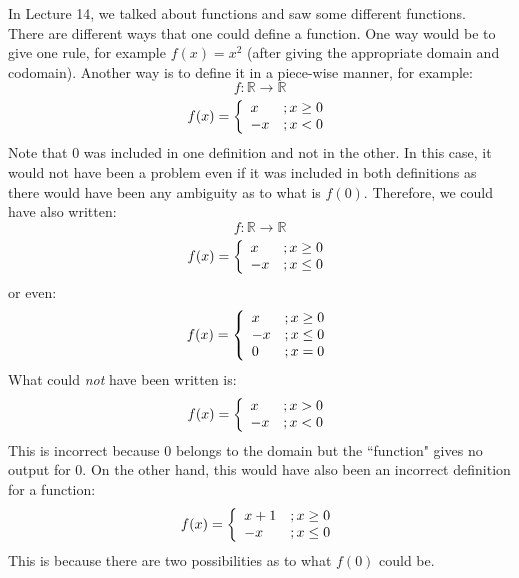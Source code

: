 In Lecture 14, we talked about functions and saw some different functions.\\
There are different ways that one could define a function. One way would be to give one rule, for example $f(x) = x^2$ (after giving the appropriate domain and codomain). Another way is to define it in a piece-wise manner, for example:\\
$$f:\mathbb{R}\to\mathbb{R}$$
$$f(x) = \left\{
\begin{array}{l r}
    x & ;x\ge 0 \\
    -x & ;x < 0
\end{array}\right.$$
Note that 0 was included in one definition and not in the other. In this case, it would not have been a problem even if it was included in both definitions as there would have been any ambiguity as to what is $f(0)$. Therefore, we could have also written:\\
$$f:\mathbb{R}\to\mathbb{R}$$
$$f(x) = \left\{
\begin{array}{l r}
    x & ;x\ge 0 \\
    -x & ;x \le 0
\end{array}\right.$$
or even:
\\$$f(x) = \left\{
\begin{array}{l r}
    x & ;x\ge 0 \\
    -x & ;x \le 0 \\
    0 & ;x = 0
\end{array}\right.$$
What could \textit{not} have been written is:\\
$$f(x) = \left\{
\begin{array}{l r}
    x & ;x > 0 \\
    -x & ;x < 0
\end{array}\right.$$
This is incorrect because $0$ belongs to the domain but the ``function" gives no output for $0$. On the other hand, this would have also been an incorrect definition for a function:
$$f(x) = \left\{
\begin{array}{l r}
    x+1 & ;x \ge 0 \\
    -x & ;x \le 0
\end{array}\right.$$
This is because there are two possibilities as to what $f(0)$ could be.

\dotfill


